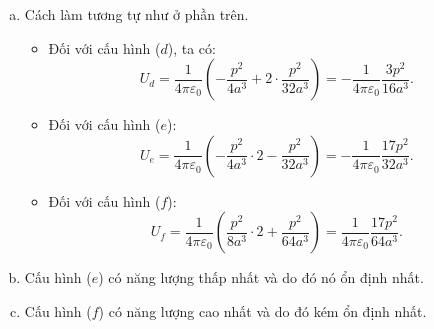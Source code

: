 \begin{loigiai}
\begin{enumerate}[1)]
\begin{enumerate}[a)]
     \item Cách làm tương tự như ở phần trên.
     \begin{itemize}
         \item Đối với cấu hình ($d$), ta có:
     \[{U}_{{d}}=\dfrac{1}{4 \pi \varepsilon_{0}}\left(-\dfrac{{p}^{2}}{4 {a}^{3}}+2 \cdot \dfrac{{p}^{2}}{32 {a}^{3}}\right)=-\dfrac{1}{4 \pi \varepsilon_{0}} \dfrac{3 {p}^{2}}{16 {a}^{3}}. \tag{7}\]
     \item  Đối với cấu hình ($e$):
    \[{U}_{{e}}=\dfrac{1}{4 \pi \varepsilon_{0}}\left(-\dfrac{{p}^{2}}{4 {a}^{3}} \cdot 2-\dfrac{{p}^{2}}{32 {a}^{3}}\right)=-\dfrac{1}{4 \pi \varepsilon_{0}} \dfrac{17 {p}^{2}}{32 {a}^{3}}. \tag{8}\]
    \item Đối với cấu hình ($f$):
    \[{U}_{{f}}=\dfrac{1}{4 \pi \varepsilon_{0}}\left(\dfrac{{p}^{2}}{8 {a}^{3}} \cdot 2+\dfrac{{p}^{2}}{64 {a}^{3}}\right)=\dfrac{1}{4 \pi \varepsilon_{0}} \dfrac{17 {p}^{2}}{64 {a}^{3}}. \tag{9}\]
     \end{itemize}
  \item Cấu hình ($e$) có năng lượng thấp nhất và do đó nó ổn định nhất.
  \item Cấu hình ($f$) có năng lượng cao nhất và do đó kém ổn định nhất.
 \end{enumerate}
\end{enumerate}
\end{loigiai}


